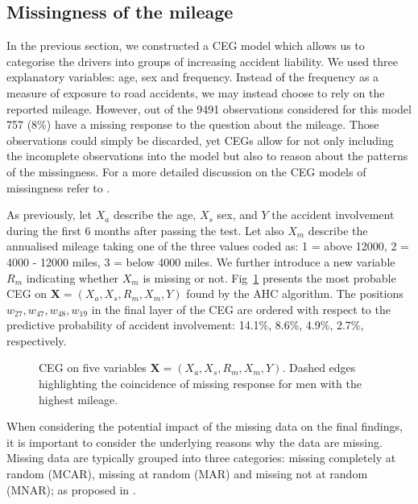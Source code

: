 \documentclass[runningheads]{llncs}
\begin{document}
\subsection{Missingness of the mileage}\label{subsec:missing-miles}
In the previous section, we constructed a CEG model which allows us to categorise the drivers into groups of increasing accident liability. We used three explanatory variables: age, sex and frequency. Instead of the frequency as a measure of exposure to road accidents, we may instead choose to rely on the reported mileage. However, out of the 9491 observations considered for this model 757 (8\%) have a missing response to the question about the mileage. Those observations could simply be discarded, yet CEGs allow for not only including the incomplete observations into the model but also to reason about the patterns of the missingness. For a more detailed discussion on the CEG models of missingness refer to \cite{barclay2014missingness}. 

As previously, let $X_a$ describe the age, $X_s$ sex, and $Y$ the accident involvement during the first 6 months after passing the test. Let also $X_m$ describe the annualised mileage taking one of the three values coded as:  1 = above 12000, 2 = 4000 - 12000 miles, 3 = below 4000 miles. We further introduce a new variable $R_m$ indicating whether $X_m$ is missing or not. Fig~\ref{ceg:mis-miles} presents the most probable CEG on $\boldsymbol{X} = (X_a, X_s, R_m, X_m, Y)$ found by the AHC algorithm. The positions $w_{27}, w_{47}, w_{48}, w_{19}$ in the final layer of the CEG are ordered with respect to the predictive probability of accident involvement: 14.1\%, 8.6\%, 4.9\%, 2.7\%, respectively.
\begin{figure}
\centering

\caption{CEG on five variables $\boldsymbol{X} = (X_a, X_s, R_m, X_m, Y)$. Dashed edges highlighting the coincidence of missing response for men with the highest mileage.}
\label{ceg:mis-miles}
\end{figure}
When considering the potential impact of the missing data on the final findings, it is important to consider the underlying reasons why the data are missing. Missing data are typically grouped into three categories: missing completely at random (MCAR), missing at random (MAR) and missing not at random (MNAR); as proposed in \cite{rubin1989nonresponse}. 
\end{document}
